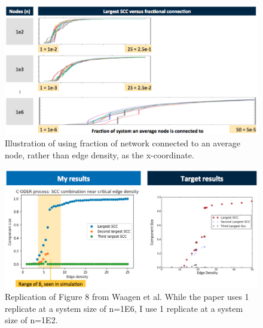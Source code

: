 \documentclass[11pt, oneside]{article}   	%
\begin{document}
\begin{figure}[h]
\centering
\includegraphics[width =\textwidth]{figs/fig56-proposal.png}
\caption{Illustration of using fraction of network connected to an average node, rather than edge density, as the x-coordinate.}
\label{fig:fig56-proposal}
\end{figure}


\begin{figure}[h]
\centering
\includegraphics[width =\textwidth]{figs/fig8.png}
\caption{Replication of Figure 8 from Waagen et al. While the paper uses 1 replicate at a system size of n=1E6, I use 1 replicate at a system size of n=1E2.}
\label{fig:fig8}
\end{figure}
\end{document}
